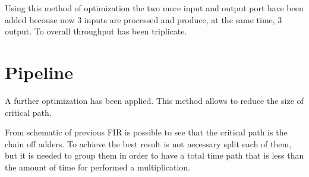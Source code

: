 Using this method of optimization the two more input and output port have been added becouse
now 3 inputs are processed and produce, at the same time, 3 output. To overall throughput has
been triplicate.


\section{Pipeline}

A further optimization has been applied. This method allows to reduce the size of critical path.

From schematic of previous FIR is possible to see that the critical path is the chain off 
adders. To achieve the best result is not necessary split each of them, but it is needed to 
group them in order to have a total time path that is less than the amount of time for performed
a multiplication. 


